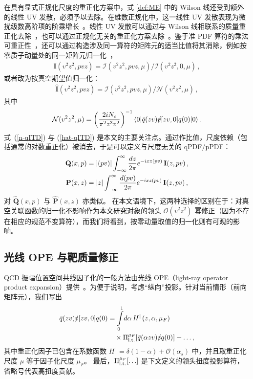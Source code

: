 在具有显式正规化尺度的重正化方案中，式 \eqref{def:ME} 中的 Wilson 线还受到额外的线性 UV 发散，必须予以去除。在维数正规化中，这一线性 UV 发散表现为微扰级数高阶项的阶乘增长~\cite{Beneke:1994sw}。线性 UV 发散可以通过与 Wilson 线相联系的质量重正化去除~\cite{Dotsenko:1979wb,Craigie:1980qs,Dorn:1986dt}，也可以通过正规化无关的重正化方案去除~\cite{Martinelli:1995vj,Stewart:2017tvs,Chen:2017mzz}。鉴于准 PDF 算符的乘法可重正性~\cite{Ji:2017oey,Ishikawa:2017faj,Green:2017xeu}，还可以通过构造涉及同一算符的矩阵元的适当比值将其消除，例如按零质子动量处的同一矩阵元归一化~\cite{Orginos:2017kos}，
\begin{align}
\label{n-qITD}
     \mathbf{I}(v^2z^2, pvz) =  \mathcal{I}(v^2z^2, pvz, \mu) / \mathcal{I}(v^2z^2, 0, \mu)\,,
\end{align}
或者改为按真空期望值归一化：
\begin{align}
\label{hat-qITD}
     \widehat{\mathbf{I}}(v^2z^2, pvz) =  \mathcal{I}(v^2z^2, pvz, \mu) / \mathcal{N}(v^2z^2,\mu)\,,
\end{align}
其中
\begin{align}
  \mathcal{N}(v^2z^2,\mu) =  \left(\frac{2 i N_c}{\pi^2 z^3 v^2}\right)^{-1} \langle 0| \bar q(zv) \slashed{v} [zv,0] q(0) |0\rangle\,.
\end{align}
式~(\ref{n-qITD}) 与 (\ref{hat-qITD}) 是本文的主要关注点。通过作比值，尺度依赖（包括通常的对数重正化）被消去，于是可以定义与尺度无关的 qPDF/pPDF：
\begin{align}
\mathbf{Q}(x,p) &= |(pv)| \int_{-\infty}^\infty \frac{d z }{2\pi} e^{-ix z (pv)} \, \mathbf{I}(z, pv)\,,
\notag\\
\mathbf{P}(x,z) &= |z| \int_{-\infty}^\infty \frac{d (pv)}{2\pi} e^{-ix z (pv) } \,  \mathbf{I}(z,pv)\,,
\end{align}
对 $\widehat{\mathbf{Q}}(x,p)$ 与 $\widehat{\mathbf{P}}(x,z)$ 亦类似。
在本文语境下，这两种选择的区别在于：对真空关联函数的归一化不影响作为本文研究对象的领头 $\mathcal{O}(v^2z^2)$ 幂修正（因为不存在相应的规范不变算符），而我们将看到，按零动量取值的归一化则有可观的影响。

%
\subsection{光线 OPE 与靶质量修正}\label{subsect_OPE}%
%

QCD 振幅位置空间共线因子化的一般方法由光线 OPE（light-ray operator product expansion）提供~\cite{Anikin:1978tj,Anikin:1979kq,Balitsky:1987bk,Mueller:1998fv,Balitsky:1990ck,Geyer:1999uq}。为便于说明，考虑``纵向''投影。针对当前情形（前向矩阵元），我们写出
\begin{align}
\label{light-ray-OPE}
 \bar q(zv) \slashed{v} [zv,0] q(0) &= \int\limits_0^1\!d\alpha \, H^\parallel(z,\alpha,\mu_F)
\notag\\&\quad \times \Pi_{\rm l.t.}^{\mu_F}[\bar q (\alpha z v) \slashed{z} q(0)] + \ldots,
\end{align}
其中重正化因子已包含在系数函数 $H^\parallel = \delta(1-\alpha) + \mathcal{O}(\alpha_s)$ 中，并且取重正化尺度 $\mu$ 等于因子化尺度 $\mu_F$。
最后，$\Pi_{\rm l.t.}^{\mu_F}[\ldots]$ 是下文定义的领头扭度投影算符，省略号代表高扭度贡献。

